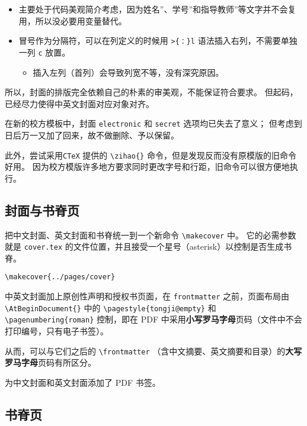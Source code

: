 \documentclass[../Main/thesis.tex]{subfiles}
\begin{document}
\begin{enumerate}
  \begin{itemize}
  \item
    主要处于代码美观简介考虑，因为姓名''、学号''和指导教师''等文字并不会复用，所以没必要用变量替代。
  \item
    冒号作为分隔符，可以在列定义的时候用 \texttt{\textgreater{}\{：\}l}
    语法插入右列，不需要单独一列 \texttt{c} 放置。

    \begin{itemize}
    \item
      插入左列（首列）会导致列宽不等，没有深究原因。
    \end{itemize}
  \end{itemize}
\end{enumerate}

所以，封面的排版完全依赖自己的朴素的审美观，不能保证符合要求。
但起码，已经尽力使得中英文封面对应对象对齐。

在新的校方模板中，封面 \texttt{electronic} 和 \texttt{secret}
选项均已失去了意义； 但考虑到日后万一又加了回来，故不做删除、予以保留。

此外，尝试采用\texttt{CTeX} 提供的 \texttt{\textbackslash{}zihao\{\}}
命令，但是发现反而没有原模版的旧命令好用。
因为校方模版许多地方要求同时更改字号和行距，旧命令可以很方便地执行。

\subsection{封面与书脊页}

把中文封面、英文封面和书脊统一到一个新命令
\texttt{\textbackslash{}makecover} 中。 它的必需参数就是
\texttt{cover.tex}
的文件位置，并且接受一个星号（asterisk）以控制是否生成书脊。

\texttt{\textbackslash{}makecover\{../pages/cover\}}

中英文封面加上原创性声明和授权书页面，在 \texttt{frontmatter}
之前，页面布局由 \texttt{\textbackslash{}AtBeginDocument\{\}} 中的
\texttt{\textbackslash{}pagestyle\{tongji@empty\}} 和
\texttt{\textbackslash{}pagenumbering\{roman\}} 控制，即在 PDF
中采用\textbf{小写罗马字母}页码（文件中不会打印编号，只有电子书签）。

从而，可以与它们之后的 \texttt{\textbackslash{}frontmatter}
（含中文摘要、英文摘要和目录）的\textbf{大写罗马字母}页码有所区分。

为中文封面和英文封面添加了 PDF 书签。

\subsection{书脊页}
\end{document}
